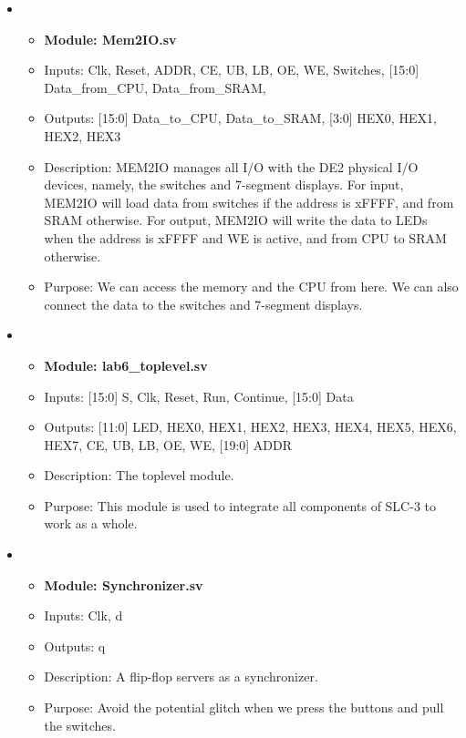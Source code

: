 \documentclass[11pt]{article}
\begin{document}
\begin{itemize}
    \item
    \begin{itemize}
        \item \textbf{Module: Mem2IO.sv}
        \item Inputs: Clk, 
        Reset,
        ADDR, 
        CE, UB, LB, OE, WE,
        Switches,
        [15:0] Data\_from\_CPU, Data\_from\_SRAM,
        \item Outputs: [15:0] Data\_to\_CPU, Data\_to\_SRAM,
        [3:0]  HEX0, HEX1, HEX2, HEX3 
        \item Description: MEM2IO manages all I/O with the DE2 physical I/O devices, namely, the switches and 7-segment displays. For input, MEM2IO will load data from switches if the address is xFFFF, and from SRAM otherwise. For output, MEM2IO will write the data to LEDs when the address is xFFFF and WE is active, and from CPU to SRAM otherwise.
        \item Purpose: We can access the memory and the CPU from here. We can also connect the data to the switches and 7-segment displays.
    \end{itemize}

    \item
    \begin{itemize}
        \item \textbf{Module: lab6\_toplevel.sv}
        \item Inputs: [15:0] S, Clk, Reset, Run, Continue, [15:0] Data
        \item Outputs: [11:0] LED, HEX0, HEX1, HEX2, HEX3, HEX4, HEX5, HEX6, HEX7, CE, UB, LB, OE, WE, [19:0] ADDR
        \item Description: The toplevel module.
        \item Purpose: This module is used to integrate all components of SLC-3 to work as a whole.
    \end{itemize}

    \item
    \begin{itemize}
        \item \textbf{Module: Synchronizer.sv}
        \item Inputs: Clk, d
        \item Outputs: q
        \item Description: A flip-flop servers as a synchronizer.
        \item Purpose: Avoid the potential glitch when we press the buttons and pull the switches.
    \end{itemize}


\end{itemize}
\end{document}
